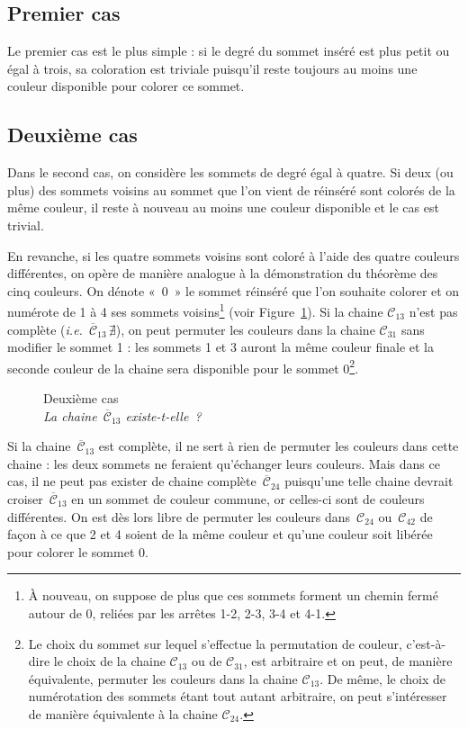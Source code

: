 \documentclass[french]{report}
\begin{document}
\subsection*{Premier cas}

Le premier cas est le plus simple : si le degré du sommet inséré est plus petit ou égal à trois, sa coloration est triviale puisqu'il reste toujours au moins une couleur disponible pour colorer ce sommet.

\subsection*{Deuxième cas}

Dans le second cas, on considère les sommets de degré égal à quatre. Si deux (ou plus) des sommets voisins au sommet que l'on vient de réinséré sont colorés de la même couleur, il reste à nouveau au moins une couleur disponible et le cas est trivial.

En revanche, si les quatre sommets voisins sont coloré à l'aide des quatre couleurs différentes, on opère de manière analogue à la démonstration du théorème des cinq couleurs. On dénote «~0~» le sommet réinséré que l'on souhaite colorer et on numérote de 1 à 4 ses sommets voisins\footnote{À nouveau, on suppose de plus que ces sommets forment un chemin fermé autour de 0, reliées par les arrêtes 1-2, 2-3, 3-4 et 4-1.} (voir Figure~\ref{fig:Deuxième}). Si la chaine $\mathcal{C}_{13}$ n'est pas complète (\textit{i.e.}~$\overline{\mathcal{C}}_{13}\,\nexists$), on peut permuter les couleurs dans la chaine $\mathcal{C}_{31}$ sans modifier le sommet 1 : les sommets 1 et 3 auront la même couleur finale et la seconde couleur de la chaine sera disponible pour le sommet 0\footnote{Le choix du sommet sur lequel s'effectue la permutation de couleur, c'est-à-dire le choix de la chaine $\mathcal{C}_{13}$ ou de $\mathcal{C}_{31}$, est arbitraire et on peut, de manière équivalente, permuter les couleurs dans la chaine $\mathcal{C}_{13}$. De même, le choix de numérotation des sommets étant tout autant arbitraire, on peut s'intéresser de manière équivalente à la chaine $\mathcal{C}_{24}$.}.

\begin{figure}
	
	\caption{Deuxième cas\\\footnotesize\textit{La chaine~$\overline{\mathcal{C}}_{13}$ existe-t-elle~?}}
	\label{fig:Deuxième}
\end{figure}

Si la chaine~$\overline{\mathcal{C}}_{13}$ est complète, il ne sert à rien de permuter les couleurs dans cette chaine : les deux sommets ne feraient qu'échanger leurs couleurs. Mais dans ce cas, il ne peut pas exister de chaine complète~$\overline{\mathcal{C}}_{24}$ puisqu'une telle chaine devrait croiser~$\overline{\mathcal{C}}_{13}$ en un sommet de couleur commune, or celles-ci sont de couleurs différentes. On est dès lors libre de permuter les couleurs dans~$\mathcal{C}_{24}$ ou~$\mathcal{C}_{42}$ de façon à ce que 2 et 4 soient de la même couleur et qu'une couleur soit libérée pour colorer le sommet 0.
\end{document}

